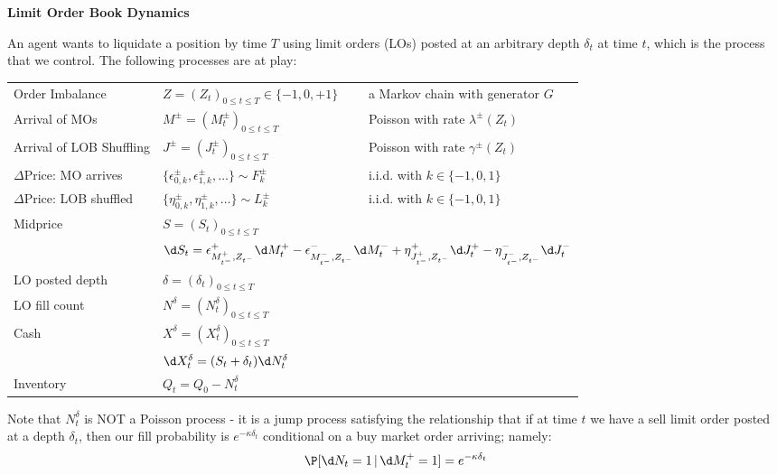 \documentclass[12pt]{article}
\begin{document}
\mymascheader
\pagestyle{plain}
{\begin{center} {\large {\bf Limit Order Book Dynamics}} \end{center}}
\bigskip


An agent wants to liquidate a position by time $T$ using limit orders (LOs) posted at an arbitrary depth $\delta_t$ at time $t$, which is the process that we control. The following processes are at play:

\begin{tabular}{lll}
Order Imbalance & $Z = (Z_t)_{0 \leq t \leq T} \in \{ -1, 0, +1 \}$ & a Markov chain with generator $G$ \\
Arrival of MOs & $M^{\pm} = (M^{\pm}_t)_{0 \leq t \leq T}$ & Poisson with rate $\lambda^{\pm}(Z_t)$ \\
Arrival of LOB Shuffling & $J^{\pm} = (J^{\pm}_t)_{0 \leq t \leq T}$ & Poisson with rate $\gamma^{\pm}(Z_t)$ \\
$\Delta\text{Price:}$ MO arrives & $\{ \epsilon^\pm_{0,k}, \epsilon^\pm_{1,k}, \dots \} \sim F^\pm_k$ & i.i.d. with $k \in \{ -1,0,1 \}$ \\
$\Delta\text{Price:}$ LOB shuffled & $\{ \eta^\pm_{0,k}, \eta^\pm_{1,k}, \dots \} \sim L^\pm_k$ & i.i.d. with $k \in \{ -1,0,1 \}$ \\
\multirow{2}{*}{Midprice} & $S = (S_t)_{0 \leq t \leq T}$ & \\
& \multicolumn{2}{l}{$\d S_t = \epsilon^+_{M^+_{t^-},Z_{t^-}} \d M^+_t - \epsilon^-_{M^-_{t^-},Z_{t^-}} \d M^-_t + \eta^+_{J^+_{t^-},Z_{t^-}} \d J^+_t - \eta^-_{J^-_{t^-},Z_{t^-}} \d J^-_t$}\\
LO posted depth & $\delta = (\delta_t)_{0 \leq t \leq T}$ &  \\
LO fill count & $N^{\delta} = (N^{\delta}_t)_{0 \leq t \leq T}$ &  \\
\multirow{2}{*}{Cash} & $X^{\delta} = (X^{\delta}_t)_{0 \leq t \leq T}$ & \\
& \multicolumn{2}{l}{$\d X^{\delta}_t = (S_t + \delta_t) \d N^{\delta}_t$} \\
Inventory & $Q_t = Q_0 - N_t^\delta$ & \\
\end{tabular}

Note that $N^{\delta}_t$ is NOT a Poisson process - it is a jump process satisfying the relationship that if at time $t$ we have a sell limit order posted at a depth $\delta_t$, then our fill probability is $e^{-\kappa \delta_t}$ conditional on a buy market order arriving; namely:
\[ \P [\d N_t = 1 \, | \, \d M^+_t = 1] = e^{-\kappa \delta_t} \]
\end{document}
